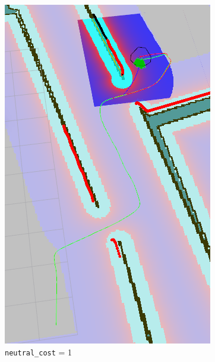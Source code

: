 \documentclass[12pt]{article}
\begin{document}
\begin{figure}[!htb]
  \includegraphics[width=\linewidth]{NC_lo.png}
  \caption{\texttt{neutral\_cost} = 1}
\endminipage\hfill
{}

\end{figure}
\end{document}
